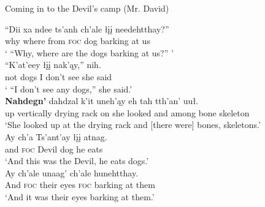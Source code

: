 \begin{exe}
\ex Coming in to the Devil's camp (Mr. David) \label{brucks:rdavid-barking-dogs}
\begin{xlist}

\ex \gll ``{Dii xa} ndee ts'anh ch'ale łįį needehtthay?''   \\
 why where from \textsc{foc} dog {barking at us}  \\
\glt ` ``Why, where are the dogs barking at us?'' ' \\

\ex \gll ``K'at'eey łįį nak'ąy,'' nih.  \\
 not dogs {I don't see} {she said}  \\
\glt ` ``I don't see any dogs,'' she said.' \\

\ex \gll  \textbf{Nahdegn'} dahdzal k'it uneh'ąy eh tah tth'an' uuł.  \\
  {up vertically} {drying rack} on {she looked} and among bone skeleton \\
\glt `She looked up at the drying rack and [there were] bones, skeletons.' \\

\ex \gll  Ay ch'a Ts'ant'ay łįį atnag.   \\
  and \textsc{foc} Devil dog {he eats} \\
\glt `And this was the Devil, he eats dogs.' \\

\ex \gll  Ay ch'ale unaag' ch'ale hunehtthay.  \\
  And \textsc{foc} {their eyes} \textsc{foc} {barking at them} \\
\glt `And it was their eyes barking at them.' \\
\end{xlist}
\end{exe}

